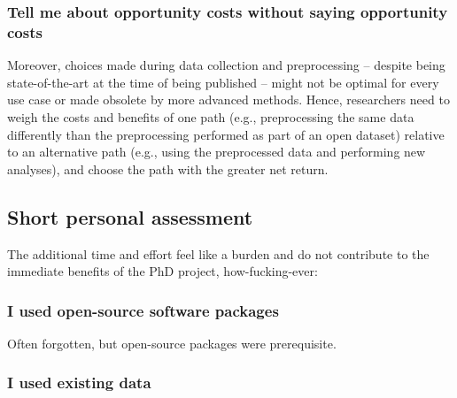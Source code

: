 \subsubsection{Tell me about opportunity costs without saying opportunity costs}

Moreover, choices made during data collection and preprocessing -- despite being
state-of-the-art at the time of being published -- might not be optimal for
every use case or made obsolete by more advanced methods.
Hence, researchers need to weigh the costs and benefits of one path (e.g.,
preprocessing the same data differently than the preprocessing performed as part
of an open dataset) relative to an alternative path (e.g., using the
preprocessed data and performing new analyses), and choose the path with the
greater net return.



\subsection{Short personal assessment}



The additional time and effort feel like a burden and do not contribute to the
immediate benefits of the PhD project, how-fucking-ever:


\subsubsection{I used open-source software packages}

Often forgotten, but open-source packages were prerequisite.


\subsubsection{I used existing data}



